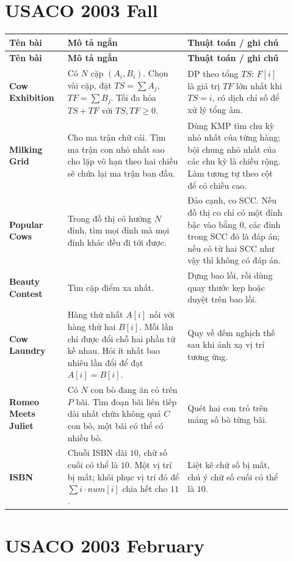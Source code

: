 \documentclass[11pt]{article}
\newenvironment{solutiontable}{%
  \small
  \setlength{\tabcolsep}{4pt}
  \renewcommand{\arraystretch}{1.14}
  \begin{longtable}{L{0.19\linewidth}L{0.39\linewidth}L{0.34\linewidth}}
  \toprule
  \textbf{Tên bài} & \textbf{Mô tả ngắn} & \textbf{Thuật toán / ghi chú}\\
  \midrule
  \endfirsthead
  \toprule
  \textbf{Tên bài} & \textbf{Mô tả ngắn} & \textbf{Thuật toán / ghi chú}\\
  \midrule
  \endhead
}{%
  \bottomrule
  \end{longtable}
  \normalsize
}
\newcommand{\problemrow}[3]{\textbf{#1} & #2 & #3\\\midrule}
\begin{document}
\section{USACO 2003 Fall}

\begin{solutiontable}
\problemrow{Cow Exhibition}{Có \(N\) cặp \((A_i,B_i)\). Chọn vài cặp, đặt \(TS=\sum A_j\), \(TF=\sum B_j\). Tối đa hóa \(TS+TF\) với \(TS,TF\ge 0\).}{DP theo tổng \(TS\): \(F[i]\) là giá trị \(TF\) lớn nhất khi \(TS=i\), có dịch chỉ số để xử lý tổng âm.}
\problemrow{Milking Grid}{Cho ma trận chữ cái. Tìm ma trận con nhỏ nhất sao cho lặp vô hạn theo hai chiều sẽ chứa lại ma trận ban đầu.}{Dùng KMP tìm chu kỳ nhỏ nhất của từng hàng; bội chung nhỏ nhất của các chu kỳ là chiều rộng. Làm tương tự theo cột để có chiều cao.}
\problemrow{Popular Cows}{Trong đồ thị có hướng \(N\) đỉnh, tìm mọi đỉnh mà mọi đỉnh khác đều đi tới được.}{Đảo cạnh, co SCC. Nếu đồ thị co chỉ có một đỉnh bậc vào bằng \(0\), các đỉnh trong SCC đó là đáp án; nếu có từ hai SCC như vậy thì không có đáp án.}
\problemrow{Beauty Contest}{Tìm cặp điểm xa nhất.}{Dựng bao lồi, rồi dùng quay thước kẹp hoặc duyệt trên bao lồi.}
\problemrow{Cow Laundry}{Hàng thứ nhất \(A[i]\) nối với hàng thứ hai \(B[i]\). Mỗi lần chỉ được đổi chỗ hai phần tử kề nhau. Hỏi ít nhất bao nhiêu lần đổi để đạt \(A[i]=B[i]\).}{Quy về đếm nghịch thế sau khi ánh xạ vị trí tương ứng.}
\problemrow{Romeo Meets Juliet}{Có \(N\) con bò đang ăn cỏ trên \(P\) bãi. Tìm đoạn bãi liên tiếp dài nhất chứa không quá \(C\) con bò, một bãi có thể có nhiều bò.}{Quét hai con trỏ trên mảng số bò từng bãi.}
\problemrow{ISBN}{Chuỗi ISBN dài \(10\), chữ số cuối có thể là \(10\). Một vị trí bị mất; khôi phục vị trí đó để \(\sum i\cdot num[i]\) chia hết cho \(11\).}{Liệt kê chữ số bị mất, chú ý chữ số cuối có thể là \(10\).}
\end{solutiontable}

\section{USACO 2003 February}
\end{document}
